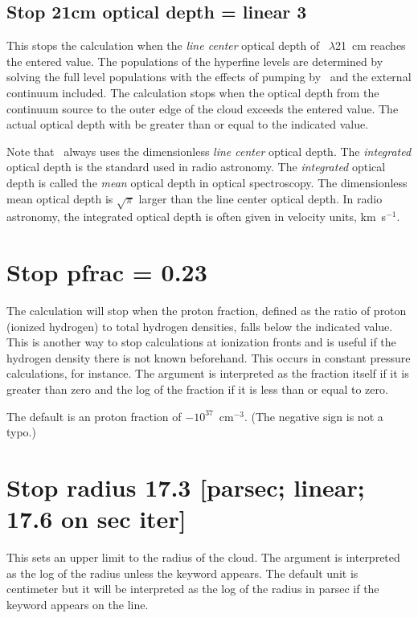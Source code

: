 \subsection{Stop 21cm optical depth = linear 3}

This stops the calculation when the \emph{line center} optical depth of \hi\ $\lambda$21~cm reaches the entered value.
The populations of the hyperfine levels
are determined by solving the full level populations with the effects of
pumping by \la\ and the external continuum included.
The calculation stops
when the optical depth from the continuum source to the outer edge of the
cloud exceeds the entered value.
The actual optical depth with be greater
than or equal to the indicated value.

Note that \Cloudy\ always uses the dimensionless \emph{line center}
optical depth.
The \emph{integrated} optical depth is the standard used
in radio astronomy.
The
\emph{integrated} optical depth is called the \emph{mean} optical depth in optical
spectroscopy.
The dimensionless mean optical depth is $\sqrt \pi  $
larger than the line center optical depth.
In radio astronomy, the
integrated optical depth is often given in velocity units, km~s$^{-1}$.

\section{Stop pfrac = 0.23}

The calculation will stop when the proton fraction, defined as the ratio
of proton (ionized hydrogen) to total hydrogen densities, falls below the
indicated value.
This is another way to stop calculations at ionization
fronts and is useful if the hydrogen density there is not known beforehand.
This occurs in constant pressure calculations, for instance.
The argument
is interpreted as the fraction itself if it is greater than zero
and the
log of the fraction if it is less than or equal to zero.

The default is an proton fraction of $-10^{37}$~cm$^{-3}$.
(The negative sign is not a typo.)

\section{Stop radius 17.3 [parsec; linear; 17.6 on sec iter] }

This sets an upper limit to the radius of the cloud.
The argument
is interpreted as the log of the radius unless the keyword
 appears.
The default unit is centimeter but it will be interpreted
as the log
of the radius in parsec if the keyword 
appears on the line.

